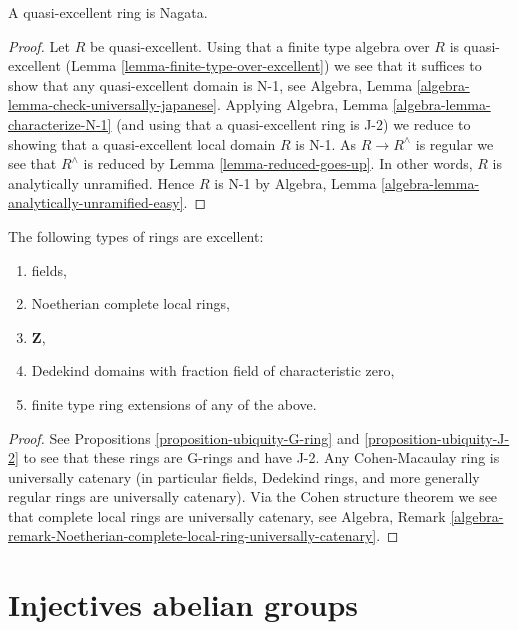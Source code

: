 \begin{lemma}
\label{lemma-quasi-excellent-nagata}
A quasi-excellent ring is Nagata.
\end{lemma}

\begin{proof}
Let $R$ be quasi-excellent.
Using that a finite type algebra over $R$ is quasi-excellent
(Lemma \ref{lemma-finite-type-over-excellent}) we see that
it suffices to show that any quasi-excellent domain is N-1, see
Algebra, Lemma \ref{algebra-lemma-check-universally-japanese}.
Applying Algebra, Lemma \ref{algebra-lemma-characterize-N-1}
(and using that a quasi-excellent ring is J-2) we reduce
to showing that a quasi-excellent local domain $R$ is N-1.
As $R \to R^\wedge$ is regular we see that $R^\wedge$
is reduced by Lemma \ref{lemma-reduced-goes-up}.
In other words, $R$ is analytically unramified.
Hence $R$ is N-1 by
Algebra, Lemma \ref{algebra-lemma-analytically-unramified-easy}.
\end{proof}

\begin{proposition}
\label{proposition-ubiquity-excellent}
The following types of rings are excellent:
\begin{enumerate}
\item fields,
\item Noetherian complete local rings,
\item $\mathbf{Z}$,
\item Dedekind domains with fraction field of characteristic zero,
\item finite type ring extensions of any of the above.
\end{enumerate}
\end{proposition}

\begin{proof}
See Propositions \ref{proposition-ubiquity-G-ring} and
\ref{proposition-ubiquity-J-2} to see that these rings are
G-rings and have J-2. Any Cohen-Macaulay ring is universally
catenary (in particular fields, Dedekind rings, and more generally
regular rings are universally catenary). Via the Cohen structure theorem 
we see that complete local rings are universally catenary, see
Algebra, Remark
\ref{algebra-remark-Noetherian-complete-local-ring-universally-catenary}.
\end{proof}








\section{Injectives abelian groups}
\label{section-abelian-groups}

